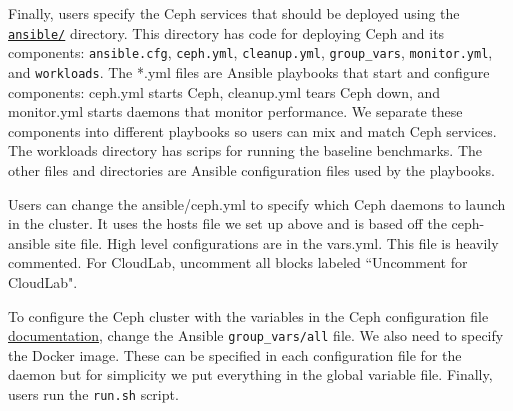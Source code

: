 Finally, users specify the Ceph services that should be deployed using the
\href{https://github.com/michaelsevilla/ceph-popper-template/tree/master/pipelines/baseline/ansible}{\texttt{ansible/}}
directory. This directory has code for deploying Ceph and its components:
\texttt{ansible.cfg}, \texttt{ceph.yml}, \texttt{cleanup.yml},
\texttt{group\_vars}, \texttt{monitor.yml}, and \texttt{workloads}. The *.yml
files are Ansible playbooks that start and configure components: ceph.yml
starts Ceph, cleanup.yml tears Ceph down, and monitor.yml starts daemons that
monitor performance. We separate these components into different playbooks so
users can mix and match Ceph services. The workloads directory has scrips for
running the baseline benchmarks. The other files and directories are Ansible
configuration files used by the playbooks.

Users can change the ansible/ceph.yml to specify which Ceph daemons to launch
in the cluster. It uses the hosts file we set up above and is based off the
ceph-ansible site file. High level configurations are in the vars.yml. This
file is heavily commented. For CloudLab, uncomment all blocks labeled
``Uncomment for CloudLab".

To configure the Ceph cluster with the variables in the Ceph configuration file
\href{http://docs.ceph.com/docs/jewel/rados/configuration/ceph-conf/}{documentation},
change the Ansible \texttt{group\_vars/all} file. We also need to specify the
Docker image. These can be specified in each configuration file for the daemon
but for simplicity we put everything in the global variable file. Finally,
users run the \texttt{run.sh} script. 



